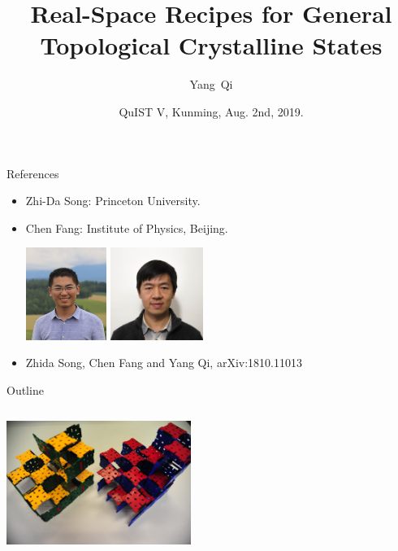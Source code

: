 \documentclass[xcolor=table, 11pt, aspectratio=169]{beamer}
\title[Space-group SPTs] %
{Real-Space Recipes for General Topological Crystalline States}
\author[Y Qi] %
{Yang~Qi}
\institute[Fudan] %
{Department of Physics, Fudan University}
\date{QuIST V, Kunming, Aug. 2nd, 2019.}
\begin{document}
\begin{frame}
  \titlepage
\end{frame}

\begin{frame}{References}
\begin{itemize}
\item Zhi-Da Song: Princeton University.
\item Chen Fang: Institute of Physics, Beijing.
\begin{center}
	\includegraphics[height=3cm]{../people/zhidasong}
	\includegraphics[height=3cm]{../people/chenfang}
\end{center}
\item Zhida Song, Chen Fang and Yang Qi, arXiv:1810.11013
\end{itemize}
\end{frame}

\begin{frame}{Outline}
	\begin{columns}
		\begin{column}[t]{.45\textwidth}
		\begin{center}
			\includegraphics[height=4cm]{toys}
		\end{center}
	\end{column}
	\begin{minipage}[t][0.5\textheight]{0.55\textwidth}
      \tableofcontents
    \end{minipage}\hfill
	\end{columns}
\end{frame}
\end{document}
